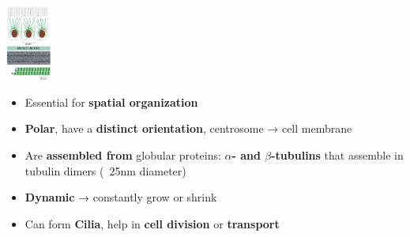 \begin{minipage}{0.15\linewidth}
    \includegraphics[width=15mm]{src/Images/microtubules.png}
\end{minipage}
\begin{minipage}{0.85\linewidth}
\begin{itemize}
    \item Essential for \textbf{spatial organization}
    \item \textbf{Polar}, have a \textbf{distinct orientation}, centrosome → cell membrane
    \item Are \textbf{assembled from} globular proteins: \textbf{$\alpha$- and $\beta$-tubulins} that assemble in tubulin dimers (~25nm diameter)
    \item \textbf{Dynamic} → constantly grow or shrink
    \item Can form \textbf{Cilia}, help in \textbf{cell division} or \textbf{transport}
\end{itemize}
\end{minipage}
